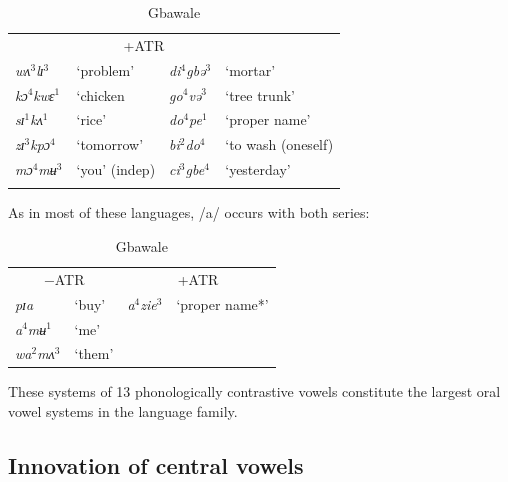 \documentclass[output=paper,newtxmath,modfonts,nonflat,draft]{langsci/langscibook}
\begin{document}
\begin{table}
\label{tab:zogbo:9}
\caption{Gbawale \citep{Seri1987}}
\begin{tabular}{llll}
\lsptoprule
\multicolumn{2}{c}{−ATR} & \multicolumn{2}{c}{+ATR}\\

\textit{wʌ}$^3$\textit{lɪ}$^3$  &  ‘problem’  &     \textit{di}$^4$\textit{gbə}$^3$ & ‘mortar’ \\

\textit{kɔ}$^4$\textit{kwɛ}$^1$ & ‘chicken &      \textit{go}$^4$\textit{və}$^3$ &  ‘tree trunk’\\

\textit{sɪ}$^1$\textit{kʌ}$^1$ & ‘rice’  &       \textit{do}$^4$\textit{pe}$^1$ &  ‘proper name’ \\ 

\textit{zɪ}$^3$\textit{kpɔ}$^4$ & ‘tomorrow’   &    \textit{bi}$^2$\textit{do}$^4$ &  ‘to wash (oneself)\\

\textit{mɔ}$^4$\textit{mʉ}$^3$ & ‘you’ (indep)   &   \textit{ci}$^3$\textit{gbe}$^4$ & ‘yesterday’\\
\lspbottomrule
\end{tabular}
\end{table}

As in most of these languages, /a/ occurs with both series: 

\newline

\begin{table}
\label{ex:zogbo:10}
\caption{Gbawale \citep{Seri1987}}
\begin{tabular}{llll}
\multicolumn{2}{c}{−ATR} & \multicolumn{2}{c}{+ATR} \\

\textit{pɪa}  & ‘buy’ & \textit{a}$^4$\textit{zie}$^3$ & ‘proper name*’ \\ 

\textit{a}$^4$\textit{mʉ}$^1$ & ‘me’ \\

\textit{wa}$^2$\textit{mʌ}$^3$ & ‘them’ \\
\end{tabular}
\end{table}

These systems of 13 phonologically contrastive vowels constitute the largest oral vowel systems in the  language family.  

\subsection{Innovation of central vowels}\label{sec:zogbo:2.1} 
\end{document}
